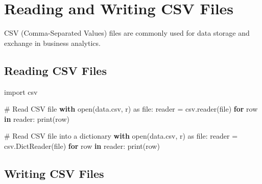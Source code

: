 \documentclass[
  letterpaper,
  DIV=11,
  numbers=noendperiod]{scrreprt}
\newenvironment{Shaded}{\begin{snugshade}}{\end{snugshade}}
\newcommand{\BuiltInTok}[1]{\textcolor[rgb]{0.00,0.23,0.31}{#1}}
\newcommand{\CommentTok}[1]{\textcolor[rgb]{0.37,0.37,0.37}{#1}}
\newcommand{\ControlFlowTok}[1]{\textcolor[rgb]{0.00,0.23,0.31}{\textbf{#1}}}
\newcommand{\ImportTok}[1]{\textcolor[rgb]{0.00,0.46,0.62}{#1}}
\newcommand{\KeywordTok}[1]{\textcolor[rgb]{0.00,0.23,0.31}{\textbf{#1}}}
\newcommand{\NormalTok}[1]{\textcolor[rgb]{0.00,0.23,0.31}{#1}}
\newcommand{\OperatorTok}[1]{\textcolor[rgb]{0.37,0.37,0.37}{#1}}
\newcommand{\StringTok}[1]{\textcolor[rgb]{0.13,0.47,0.30}{#1}}
\begin{document}
\section{Reading and Writing CSV
Files}\label{reading-and-writing-csv-files}

CSV (Comma-Separated Values) files are commonly used for data storage
and exchange in business analytics.

\subsection{Reading CSV Files}\label{reading-csv-files-1}

\begin{Shaded}
\begin{Highlighting}[]
\ImportTok{import}\NormalTok{ csv}

\CommentTok{\# Read CSV file}
\ControlFlowTok{with} \BuiltInTok{open}\NormalTok{(}\StringTok{\textquotesingle{}data.csv\textquotesingle{}}\NormalTok{, }\StringTok{\textquotesingle{}r\textquotesingle{}}\NormalTok{) }\ImportTok{as} \BuiltInTok{file}\NormalTok{:}
\NormalTok{    reader }\OperatorTok{=}\NormalTok{ csv.reader(}\BuiltInTok{file}\NormalTok{)}
    \ControlFlowTok{for}\NormalTok{ row }\KeywordTok{in}\NormalTok{ reader:}
        \BuiltInTok{print}\NormalTok{(row)}

\CommentTok{\# Read CSV file into a dictionary}
\ControlFlowTok{with} \BuiltInTok{open}\NormalTok{(}\StringTok{\textquotesingle{}data.csv\textquotesingle{}}\NormalTok{, }\StringTok{\textquotesingle{}r\textquotesingle{}}\NormalTok{) }\ImportTok{as} \BuiltInTok{file}\NormalTok{:}
\NormalTok{    reader }\OperatorTok{=}\NormalTok{ csv.DictReader(}\BuiltInTok{file}\NormalTok{)}
    \ControlFlowTok{for}\NormalTok{ row }\KeywordTok{in}\NormalTok{ reader:}
        \BuiltInTok{print}\NormalTok{(row)}
\end{Highlighting}
\end{Shaded}

\subsection{Writing CSV Files}\label{writing-csv-files-1}
\end{document}

